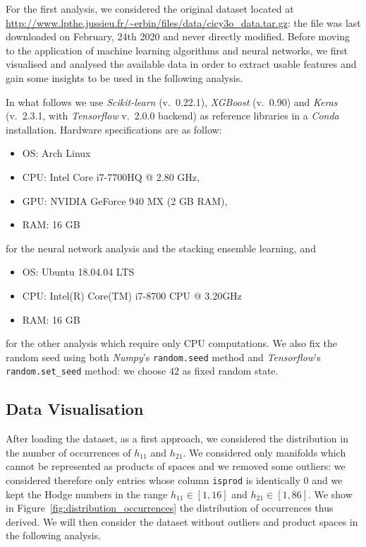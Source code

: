 For the first analysis, we considered the original dataset located at \url{http://www.lpthe.jussieu.fr/~erbin/files/data/cicy3o_data.tar.gz}: the file was last downloaded on February, 24th 2020 and never directly modified. Before moving to the application of machine learning algorithms and neural networks, we first visualised and analysed the available data in order to extract usable features and gain some insights to be used in the following analysis.

In what follows we use \textit{Scikit-learn} (v.\ 0.22.1), \textit{XGBoost} (v.\ 0.90) and \textit{Keras} (v.\ 2.3.1, with \textit{Tensorflow} v.\ 2.0.0 backend) as reference libraries in a \textit{Conda} installation. Hardware specifications are as follow:
\begin{itemize}
    \item OS: Arch Linux
    \item CPU: Intel Core i7-7700HQ @ 2.80 GHz,
    \item GPU: NVIDIA GeForce 940 MX (2 GB RAM),
    \item RAM: 16 GB
\end{itemize}
for the neural network analysis and the stacking ensemble learning, and
\begin{itemize}
    \item OS: Ubuntu 18.04.04 LTS
    \item CPU: Intel(R) Core(TM) i7-8700 CPU @ 3.20GHz
    \item RAM: 16 GB
\end{itemize}
for the other analysis which require only CPU computations. We also fix the random seed using both \textit{Numpy}'s \texttt{random.seed} method and \textit{Tensorflow}'s \texttt{random.set\_seed} method: we choose $42$ as fixed random state.

\subsection{Data Visualisation}

    After loading the dataset, as a first approach, we considered the distribution in the number of occurrences of $h_{11}$ and $h_{21}$. We considered only manifolds which cannot be represented as products of spaces and we removed some outliers: we considered therefore only entries whose column \texttt{isprod} is identically $0$ and we kept the Hodge numbers in the range $h_{11} \in \left[ 1, 16 \right]$ and $h_{21} \in \left[1, 86 \right]$. We show in Figure~\ref{fig:distribution_occurrences} the distribution of occurrences thus derived. We will then consider the dataset without outliers and product spaces in the following analysis.
    
